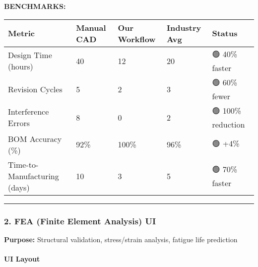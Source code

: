 \documentclass[
]{article}
\begin{document}
\textbf{BENCHMARKS:}

\begin{longtable}[]{@{}lllll@{}}
\toprule\noalign{}
Metric & Manual CAD & Our Workflow & Industry Avg & Status \\
\midrule\noalign{}
\endhead
\bottomrule\noalign{}
\endlastfoot
Design Time (hours) & 40 & 12 & 20 & 🟢 40\% faster \\
Revision Cycles & 5 & 2 & 3 & 🟢 60\% fewer \\
Interference Errors & 8 & 0 & 2 & 🟢 100\% reduction \\
BOM Accuracy (\%) & 92\% & 100\% & 96\% & 🟢 +4\% \\
Time-to-Manufacturing (days) & 10 & 3 & 5 & 🟢 70\% faster \\
\end{longtable}

\begin{center}\rule{0.5\linewidth}{0.5pt}\end{center}

\hypertarget{fea-finite-element-analysis-ui}{%
\subsubsection{2. FEA (Finite Element Analysis)
UI}\label{fea-finite-element-analysis-ui}}

\textbf{Purpose:} Structural validation, stress/strain analysis, fatigue
life prediction

\hypertarget{ui-layout}{%
\paragraph{UI Layout}\label{ui-layout}}
\end{document}
